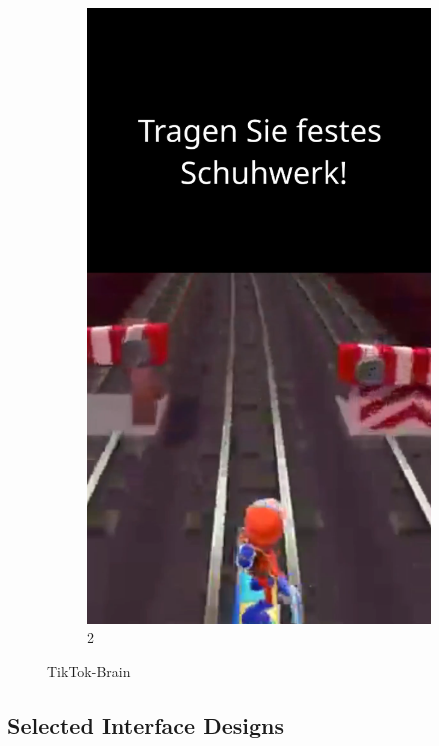 \documentclass{article}
\begin{document}
\begin{figure}[H]
\begin{subfigure}[t]{0.45\textwidth}
        \includegraphics[width=\textwidth]{./resources/StairTikTokBrain_2.png}
        \caption{2}
    \end{subfigure}
    \caption{TikTok-Brain}
    \label{fig:StairTikTokBrain}
\end{figure}


\subsection{Selected Interface Designs}
\end{document}
